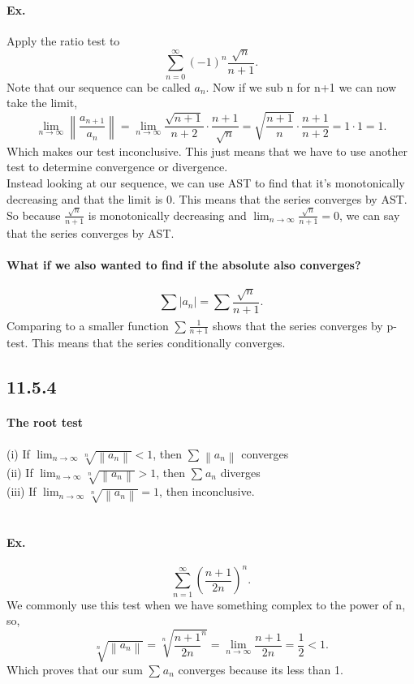 \paragraph{Ex.}
Apply the ratio test to 
\[
\sum_{ n=0 } ^{ \infty } \left( -1 \right) ^{ n }\frac{ \sqrt{ n} }{ n+1 }
.\] 
Note that our sequence can be called $ a_n $. Now if we sub n for n+1 we can now take the limit,
\[
\lim_{ n \to \infty} \left\| \frac{ a_{ n+1 } }{ a_n } \right\| = \lim_{ n \to \infty} \frac{ \sqrt{ n+1} }{ n+2 }\cdot \frac{ n+1 }{ \sqrt{ n} }= \sqrt{ \frac{ n+1 }{ n }} \cdot \frac{ n+1 }{ n+2 } = 1\cdot 1 = 1
.\] 
Which makes our test inconclusive. This just means that we have to use another test to determine convergence or divergence. \\
Instead looking at our sequence, we can use AST to find that it's monotonically decreasing and that the limit is 0. This means that the series converges by AST. So because $ \frac{ \sqrt{ n} }{ n+1 } $ is monotonically decreasing and $ \lim_{ n \to \infty} \frac{ \sqrt{ n} }{ n+1 } = 0 $, we can say that the series converges by AST.

\paragraph{What if we also wanted to find if the absolute also converges?}
\[
\sum_{ } ^{  } |a_n| = \sum_{  } ^{  } \frac{ \sqrt{ n} }{ n+1 }
.\] 
Comparing to a smaller function $ \sum_{  } ^{  } \frac{ 1 }{ n+1 } $ shows that the series converges by p-test. This means that the series conditionally converges.
\subsection*{11.5.4}%
\label{sub:11.5.4}
\paragraph{The root test }
(i) If $ \lim_{ n \to \infty} \sqrt[ n ]{ \left\| a_n \right\| } <1 $, then $ \sum_{  } ^{  } \left\| a_n \right\| $ converges \\
(ii) If $ \lim_{ n \to \infty} \sqrt[ n ]{ \left\| a_n \right\| } >1 $, then $ \sum_{  } ^{  } a_n $ diverges \\
(iii) If $ \lim_{ n \to \infty} \sqrt[ n ]{ \left\| a_n \right\| } =1 $, then inconclusive. \\ \\ 
\paragraph{Ex.}
\[
\sum_{ n=1 } ^{ \infty } \left( \frac{ n+1 }{ 2n } \right) ^{ n }
.\] 
We commonly use this test when we have something complex to the power of n, so,
\[
\sqrt[ n ]{ \left\| a_n \right\| } =\sqrt[ n ]{ \frac{ n+1 }{ 2n }^{ n } } = \lim_{ n \to \infty} \frac{ n+1 }{ 2n }=\frac{ 1 }{ 2 } < 1
.\] 
Which proves that our sum $ \sum_{  } ^{  } a_n $ converges because its less than 1.

